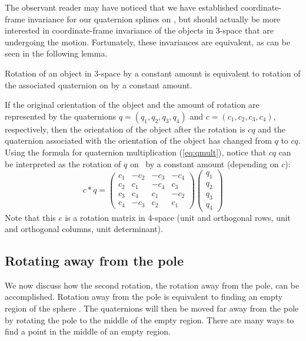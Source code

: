 \documentclass[11pt]{article}
\begin{document}
The observant reader may have noticed that we have established
coordinate-frame invariance for our quaternion splines on ,
but should actually be more interested in coordinate-frame invariance 
of the objects in 3-space that are undergoing the motion.
Fortunately, these invariances are equivalent, as can be seen in the following lemma.
%
\begin{lemma}
Rotation of an object in 3-space by a constant amount
is equivalent to rotation of the associated quaternion on 
by a constant amount.
\end{lemma}
\prf
If the original orientation of the object and the amount of
rotation are represented by the quaternions $q = (q_1,q_2,q_3,q_4)$ 
and $c = (c_1,c_2,c_3,c_4)$, respectively,
then the orientation of the object after the rotation is $c q$
and the quaternion associated with the orientation of the object
has changed from $q$ to $c q$.
Using the formula for quaternion multiplication (\ref{eq:qmult}),
notice that $c q$ can be interpreted as the rotation 
of $q$ on \ by a constant amount (depending on $c$):
\[
c * q = \left( \begin{array}{cccc}
	c_1 & -c_2 & -c_3 & -c_4 \\
	c_2 &  c_1 & -c_4 &  c_3 \\
	c_3 &  c_4 &  c_1 & -c_2 \\
	c_4 & -c_3 &  c_2 &  c_1
	\end{array} \right)
	\left( \begin{array}{c}
	q_1 \\ q_2 \\ q_3 \\ q_4
	\end{array} \right)
\]
Note that this $c$ is a rotation matrix in 4-space (unit and orthogonal rows, unit and orthogonal
columns, unit determinant).
\QED

\subsection{Rotating away from the pole}
\label{sec:polerotate}

We now discuss how the second rotation, the rotation away from the pole, 
can be accomplished.
Rotation away from the pole is equivalent to finding an empty region of the sphere .
The quaternions will then be moved far away from the
pole by rotating the pole to the middle of the empty region.
There are many ways to find a point in the middle of an empty region.
\end{document}
